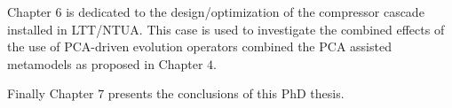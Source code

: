 Chapter $6$ is dedicated to the design/optimization of the compressor cascade installed in LTT/NTUA. This case is used to investigate the combined effects of the use of PCA-driven evolution operators combined the PCA assisted metamodels as proposed in Chapter $4$.

Finally Chapter $7$ presents the conclusions of this PhD thesis.      









